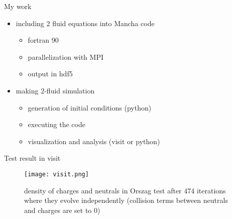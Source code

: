 \documentclass{beamer}
\begin{document}
\begin{frame}{My work}
\begin{itemize}
\item including 2 fluid equations into  Mancha code
\begin{itemize}
\item fortran 90
\item parallelization with MPI
\item output in hdf5
\end{itemize}
\item making 2-fluid simulation
\begin{itemize}
\item generation of initial conditions (python)
\item executing the code
\item visualization  and analysis (visit or python)
\end{itemize}
\end{itemize}
\end{frame}

\begin{frame}{Test result in visit}
\begin{figure}[H]
 \centering
 \texttt{[image: visit.png]}
  \caption{density of charges and neutrals in Orszag test after 474 iterations where they evolve independently (collision terms between neutrals and charges are set to 0)}
\end{figure}
\end{frame}
\end{document}
